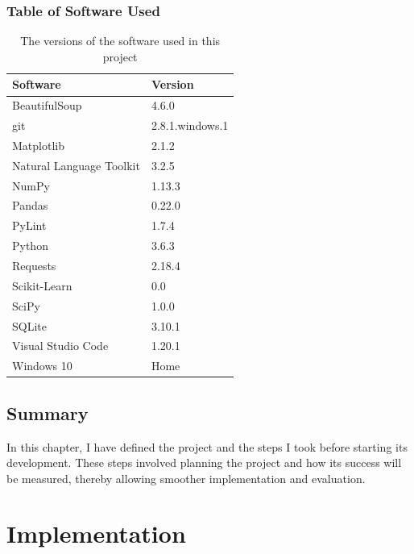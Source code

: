 \documentclass[12pt,a4paper,twoside,openright]{report}
\begin{document}
\subsection{Table of Software Used}
\begin{table}[H]
	\centering
	\label{table:software}
	\begin{tabular}{ll}
		\textbf{Software}        & \textbf{Version} \\ \hline
		BeautifulSoup            & 4.6.0            \\
		git                      & 2.8.1.windows.1  \\
		Matplotlib               & 2.1.2            \\
		Natural Language Toolkit & 3.2.5            \\
		NumPy                    & 1.13.3           \\
		Pandas                   & 0.22.0           \\
		PyLint                   & 1.7.4            \\
		Python                   & 3.6.3            \\
		Requests                 & 2.18.4           \\
		Scikit-Learn             & 0.0              \\
		SciPy                    & 1.0.0            \\
		SQLite                   & 3.10.1           \\
		Visual Studio Code       & 1.20.1           \\
		Windows 10               & Home             \\
	\end{tabular}
	\caption{The versions of the software used in this project}
\end{table}

\section{Summary}

In this chapter, I have defined the project and the steps I took before starting its development. These steps involved planning the project and how its success will be measured, thereby allowing smoother implementation and evaluation.

\chapter{Implementation} \label{impl}
\end{document}
